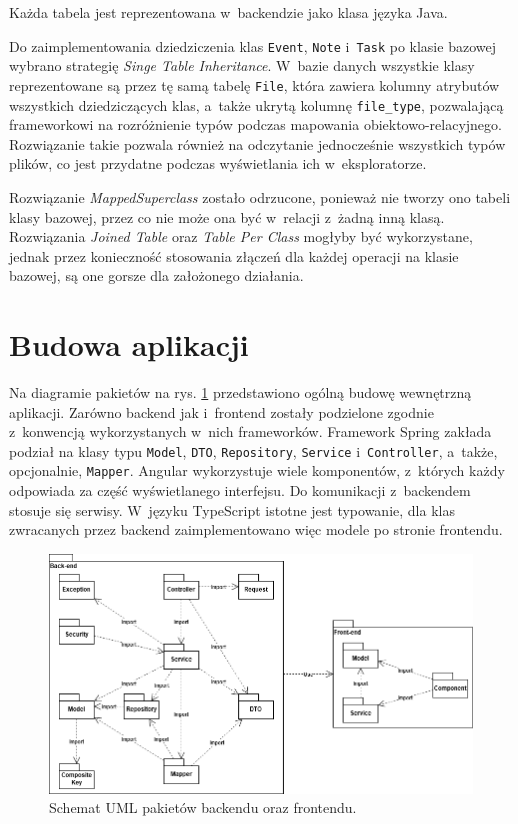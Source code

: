 \documentclass[a4paper,twoside,12pt]{book}
\newcommand{\obcy}[1]{\emph{#1}}
\newcommand{\english}[1]{{\selectlanguage{british}\obcy{#1}}}
\begin{document}
Każda tabela jest reprezentowana w~backendzie jako klasa języka Java. 

Do zaimplementowania dziedziczenia klas \texttt{Event}, \texttt{Note} i~\texttt{Task} po klasie bazowej wybrano strategię \english{Singe Table Inheritance}. W~bazie danych wszystkie klasy reprezentowane są przez tę samą tabelę \texttt{File}, która zawiera kolumny atrybutów wszystkich dziedziczących klas, a~także ukrytą kolumnę \texttt{file_type}, pozwalającą frameworkowi na rozróżnienie typów podczas mapowania obiektowo-relacyjnego. Rozwiązanie takie pozwala również na odczytanie jednocześnie wszystkich typów plików, co jest przydatne podczas wyświetlania ich w~eksploratorze.

Rozwiązanie \english{MappedSuperclass} zostało odrzucone, ponieważ nie tworzy ono tabeli klasy bazowej, przez co nie może ona być w~relacji z~żadną inną klasą. Rozwiązania \english{Joined Table} oraz \english{Table Per Class} mogłyby być wykorzystane, jednak przez konieczność stosowania złączeń dla każdej operacji na klasie bazowej, są one gorsze dla założonego działania.

\section{Budowa aplikacji}

Na diagramie pakietów na rys. \ref{fig:package} przedstawiono ogólną budowę wewnętrzną aplikacji. Zarówno backend jak i~frontend zostały podzielone zgodnie z~konwencją wykorzystanych w~nich frameworków. Framework Spring zakłada podział na klasy typu \texttt{Model}, \texttt{DTO}, \texttt{Repository}, \texttt{Service} i~\texttt{Controller}, a~także, opcjonalnie, \texttt{Mapper}. Angular wykorzystuje wiele komponentów, z~których każdy odpowiada za część wyświetlanego interfejsu. Do komunikacji z~backendem stosuje się serwisy. W~języku TypeScript istotne jest typowanie, dla klas zwracanych przez backend zaimplementowano więc modele po stronie frontendu.

\begin{figure}
\centering
\includegraphics[width=\textwidth]{./UML-Package.png}
\caption{Schemat UML pakietów backendu oraz frontendu.}
\label{fig:package}
\end{figure}
\end{document}
